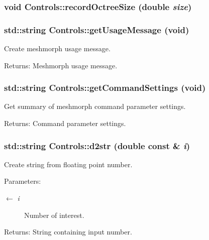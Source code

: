 \subsubsection{\setlength{\rightskip}{0pt plus 5cm}void Controls::record\-Octree\-Size (double {\em size})}\label{classControls_8565ce64696c3d62e8d21a3695312ce1}


\subsubsection{\setlength{\rightskip}{0pt plus 5cm}std::string Controls::get\-Usage\-Message (void)}\label{classControls_cc10201b6a7efde6066fd29e797abaf4}


Create meshmorph usage message. \begin{Desc}
\item[Returns:]Meshmorph usage message. \end{Desc}
\subsubsection{\setlength{\rightskip}{0pt plus 5cm}std::string Controls::get\-Command\-Settings (void)}\label{classControls_0269eba0fdedf77c19b64067a70647c3}


Get summary of meshmorph command parameter settings. \begin{Desc}
\item[Returns:]Command parameter settings. \end{Desc}
\subsubsection{\setlength{\rightskip}{0pt plus 5cm}std::string Controls::d2str (double const \& {\em i})}\label{classControls_7c302cab3bada3b96843365d108f6aa1}


Create string from floating point number. \begin{Desc}
\item[Parameters:]
\begin{description}
\item[\mbox{$\leftarrow$} {\em i}]Number of interest. \end{description}
\end{Desc}
\begin{Desc}
\item[Returns:]String containing input number. \end{Desc}
